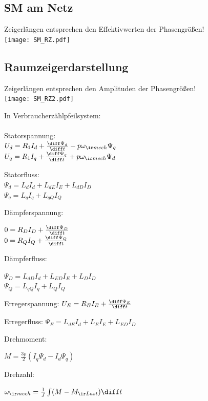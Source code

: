 \documentclass[german]{latex4ei_fs}
\begin{document}
\begin{sectionbox}
\subsection{SM am Netz} 
Zeigerlängen entsprechen den Effektivwerten der Phasengrößen! \\

\texttt{[image: SM\_RZ.pdf]}

\end{sectionbox}
\begin{sectionbox}
\subsection{Raumzeigerdarstellung}
Zeigerlängen entsprechen den Amplituden der Phasengrößen! \\

\texttt{[image: SM\_RZ2.pdf]}

In Verbraucherzählpfeilsystem: \\ \\
Statorspannung:\\
$U_d = R_1 I_d + \frac{\diff \Psi_d}{\diff t} - p \omega_{\ir mech} \Psi_q$\\
$U_q = R_1 I_q + \frac{\diff \Psi_q}{\diff t} + p \omega_{\ir mech} \Psi_d$

Statorfluss: \\
$\Psi_d = L_d I_d + L_{dE} I_E + L_{dD} I_D$ \\
$\Psi_q = L_q I_q +  L_{qQ} I_Q$


Dämpferspannung:

$0 = R_D I_D + \frac{\diff \Psi_D}{\diff t}$ \\
$0 = R_Q I_Q + \frac{\diff \Psi_Q}{\diff t}$

Dämpferfluss:

$\Psi_D = L_{dD} I_d + L_{ED} I_E + L_D I_D$ \\
$\Psi_Q = L_{qQ} I_q + L_{Q} I_{Q}$

Erregerspannung:
$U_E = R_E I_E + \frac{\diff \Psi_E}{\diff t}$

Erregerfluss:
$\Psi_E = L_{dE} I_d + L_E I_E + L_{ED} I_D$

Drehmoment:

$M = \frac{3 p}{2} (I_q \Psi_d - I_d \Psi_q)$

Drehzahl:

$\omega_{\ir mech} = \frac{1}{J} \int (M- M_{\ir Last}) \diff t$

 
 \end{sectionbox} 
\end{document}
